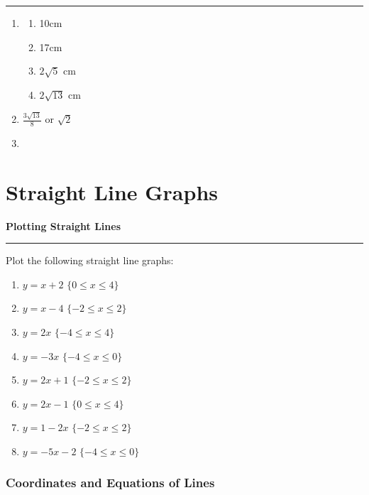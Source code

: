 \documentclass[12pt]{article}
\begin{document}
\medskip

\hrule 

\medskip

\begin{enumerate}
    \item \begin{enumerate}
        \item 10cm
        \item 17cm
        \item \(2\sqrt{5}\) cm
        \item \(2\sqrt{13}\) cm
    \end{enumerate}
    \item \(\frac{3\sqrt{13}}{8}\) or \(\sqrt{2}\)
    \item 
\end{enumerate}

\newpage

\section{Straight Line Graphs}

\newpage

\noindent \textbf{Plotting Straight Lines} 

\medskip

\hrule 

\medskip

\noindent Plot the following straight line graphs:

\begin{enumerate}
    \item \(y=x+2\) \quad \( \{0\leq x \leq 4\}\)
    \item \(y=x-4\) \quad \(\{-2\leq x \leq 2\}\)
    \item \(y=2x\) \quad \(\{-4\leq x \leq 4\}\)
    \item \(y=-3x\) \quad \(\{-4\leq x \leq 0\}\)
    \item \(y=2x+1\) \quad \(\{-2\leq x \leq 2\}\)
    \item \(y=2x-1\) \quad \(\{0\leq x \leq 4\}\)
    \item \(y=1-2x\) \quad \(\{-2\leq x \leq 2\}\)
    \item \(y=-5x-2\) \quad \(\{-4\leq x \leq 0\}\)
\end{enumerate}

\newpage

\subsubsection*{Coordinates and Equations of Lines}
\end{document}
